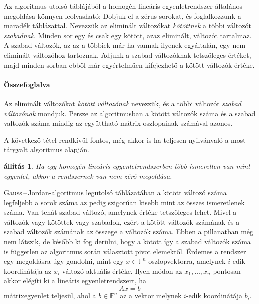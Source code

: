 \documentclass[9pt, a4paper, showtrims]{memoir}
\makeatletter
\renewenvironment{proof}[1][\proofname]
    {\par\pushQED{\qed}%
    \normalfont \topsep6\p@\@plus6\p@\relax
    \trivlist
    \item[\hskip\labelsep
        \itshape
    #1\@addpunct{:}]\ignorespaces}
    {\popQED\endtrivlist\@endpefalse}
\theoremstyle{plain}
\newtheorem{proposition}{állítás}[chapter]
\theoremstyle{remark}
\theoremstyle{definition}
\makeatother
\begin{document}
Az algoritmus utolsó táblájából a homogén lineáris egyenletrendszer általános megoldása könnyen leolvasható:
Dobjuk el a zérus sorokat, és foglalkozzunk a maradék táblázattal.
Nevezzük az eliminált változókat \emph{kötöttnek}
a többi változót \emph{szabadnak}.
Minden sor egy és csak egy kötött, azaz eliminált, változót tartalmaz.
A szabad változók, az az a többiek már ha vannak ilyenek egyáltalán, egy nem eliminált változóhoz tartoznak.
Adjunk a szabad változóknak tetszőleges értéket,
majd minden sorban ebből már egyértelműen kifejezhető a kötött változók értéke.

\paragraph{Összefoglalva}
Az eliminált változókat
\emph{kötött változónak}
nevezzük,
és a többi változót
\emph{szabad változónak}
mondjuk. 
Persze az algoritmusban a kötött változók száma és a szabad valtozók száma mindig az együttható mátrix oszlopainak számával azonos.

A következő tétel rendkívül fontos, még akkor is ha teljesen nyilvánvaló a most tárgyalt algoritmus alapján.
\begin{proposition}
	Ha egy homogén lineáris egyenletrendszerben több ismeretlen van mint egyenlet,
	akkor a rendszernek van nem zéró megoldása.
\end{proposition}
\begin{proof}
	Gauss\,--\,Jordan-algoritmus  legutolsó táblázatában
	a kötött változó száma legfeljebb a sorok száma az pedig szigorúan kisebb mint az összes ismeretlenek száma.
	Van tehát szabad változó, amelynek értéke tetszőleges lehet.
\end{proof}
Mivel a változók vagy kötöttek vagy szabadok,
ezért a kötött változók számának és a szabad változók számának az összege a változók száma.
Ebben a pillanatban még nem látszik,
de később ki fog derülni,
hogy a kötött így a szabad változók száma is független az algoritmus során választott pivot elemektől.
Érdemes a rendszer egy megoldásra úgy gondolni, mint egy $x\in\mathbb{F}^n$ oszlopvektorra,
amelynek $i$-edik koordinátája az $x_i$ változó aktuális értéke.
Ilyen módon az $x_1,\ldots,x_n$ pontosan akkor elégíti ki a lineáris egyenletrendszert,
ha
\[
	Ax=b
\]
mátrixegyenlet teljesül, ahol a $b\in\mathbb{F}^n$ az a vektor melynek $i$-edik koordinátája $b_i$.
\end{document}
